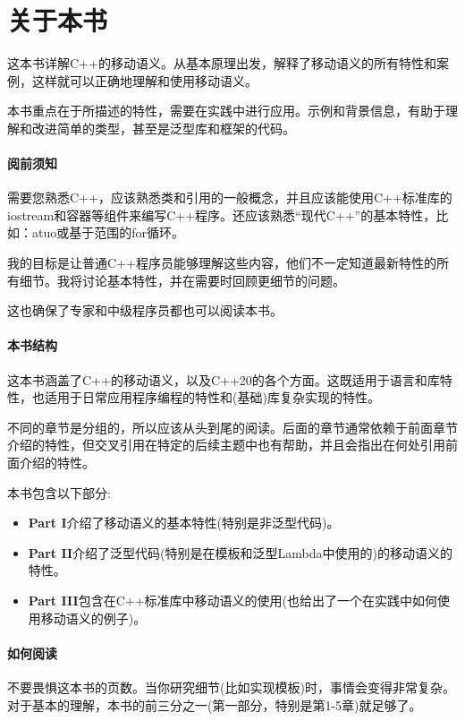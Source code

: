 \chapter{关于本书}

这本书详解C++的移动语义。从基本原理出发，解释了移动语义的所有特性和案例，这样就可以正确地理解和使用移动语义。

本书重点在于所描述的特性，需要在实践中进行应用。示例和背景信息，有助于理解和改进简单的类型，甚至是泛型库和框架的代码。

\subsubsection{阅前须知}

需要您熟悉C++，应该熟悉类和引用的一般概念，并且应该能使用C++标准库的iostream和容器等组件来编写C++程序。还应该熟悉“现代C++”的基本特性，比如：atuo或基于范围的for循环。

我的目标是让普通C++程序员能够理解这些内容，他们不一定知道最新特性的所有细节。我将讨论基本特性，并在需要时回顾更细节的问题。

这也确保了专家和中级程序员都也可以阅读本书。


\subsubsection{本书结构}

这本书涵盖了C++的移动语义，以及C++20的各个方面。这既适用于语言和库特性，也适用于日常应用程序编程的特性和(基础)库复杂实现的特性。

不同的章节是分组的，所以应该从头到尾的阅读。后面的章节通常依赖于前面章节介绍的特性，但交叉引用在特定的后续主题中也有帮助，并且会指出在何处引用前面介绍的特性。

本书包含以下部分:
\begin{itemize}
	\item \textbf{Part I}介绍了移动语义的基本特性(特别是非泛型代码)。
	\item \textbf{Part II}介绍了泛型代码(特别是在模板和泛型Lambda中使用的)的移动语义的特性。
	\item \textbf{Part III}包含在C++标准库中移动语义的使用(也给出了一个在实践中如何使用移动语义的例子)。
\end{itemize}


\subsubsection{如何阅读}

不要畏惧这本书的页数。当你研究细节(比如实现模板)时，事情会变得非常复杂。对于基本的理解，本书的前三分之一(第一部分，特别是第1-5章)就足够了。

